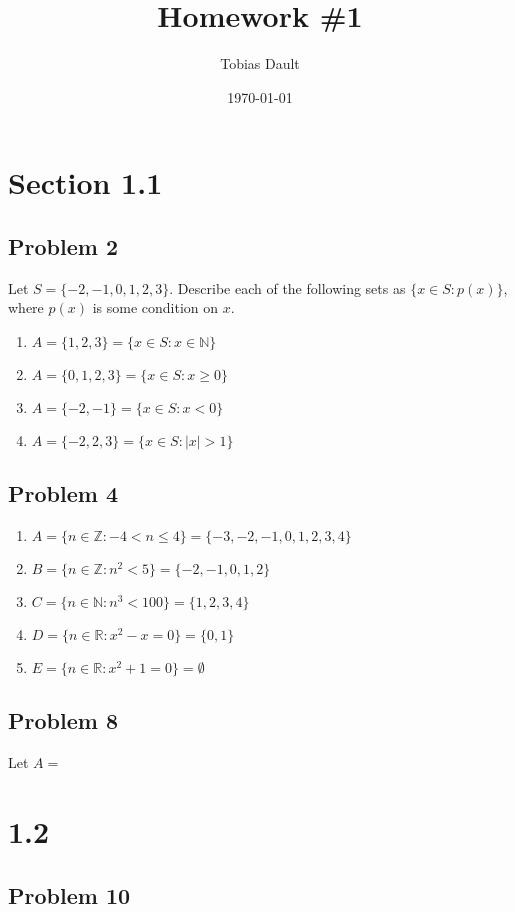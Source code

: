 \documentclass{article}
\title{Homework \#1}
\author{Tobias Dault}
\date{\today}
\begin{document}
	\maketitle 
	
	\section*{Section 1.1}
	\subsection*{Problem 2}
	Let $S=\{-2,-1,0,1,2,3\}$. Describe each of the following sets as $\{x\in S : p(x)\}$, where $p(x)$ is some condition on $x$.
	\begin{enumerate}[label=(\alph*)]
		\item $A=\{1,2,3\}=\{x\in S: x\in\mathbb{N}\}$
		\item $A=\{0,1,2,3\}=\{x\in S: x\geq0\}$
		\item $A=\{-2,-1\}=\{x\in S: x<0\}$
		\item $A=\{-2,2,3\}=\{x\in S: |x|>1\}$
	\end{enumerate}
	\subsection*{Problem 4}
	\begin{enumerate}[label=(\alph*)]
		\item $A=\{n\in\mathbb{Z}:-4<n\leq4\}=\{-3,-2,-1,0,1,2,3,4\}$
		\item $B=\{n\in\mathbb{Z}:n^2<5\}=\{-2,-1,0,1,2\}$
		\item $C=\{n\in\mathbb{N}:n^3<100\}=\{1,2,3,4\}$
		\item $D=\{n\in\mathbb{R}:x^2-x=0\}=\{0,1\}$
		\item $E=\{n\in\mathbb{R}:x^2+1=0\}=\emptyset$
	\end{enumerate}
	\subsection*{Problem 8}
	Let $A={}$
	\begin{enumerate}
		
	\end{enumerate}
	
	\section{1.2}
	\subsection*{Problem 10}
\end{document}
